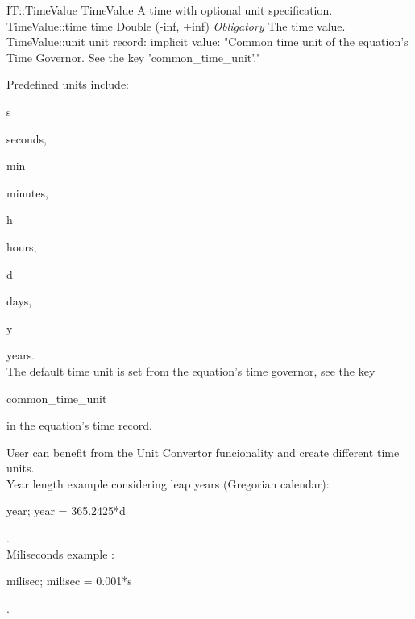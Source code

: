 \begin{TupleType}
	{IT::TimeValue}
	{TimeValue}
	{}%
	{}%
	{{{A time with optional unit specification.}%
}}
		\RecKey
			{TimeValue::time}
			{time}
			{{Double (-inf, +inf)}}{}
			{ \it{Obligatory}}
			{{{The time value.}%
}}
		\RecKey
			{TimeValue::unit}
			{unit}
			{{record: }}{}
			{implicit value: "{Common time unit of the equation's Time Governor.
See the key 'common{\_}time{\_}unit'.}"}
			{{{{Predefined units include: }\begin{ttfamily}s\end{ttfamily}{ seconds, }\begin{ttfamily}min\end{ttfamily}{ minutes, }\begin{ttfamily}h\end{ttfamily}{ hours, }\begin{ttfamily}d\end{ttfamily}{ days, }\begin{ttfamily}y\end{ttfamily}{ years.}\\{
The default time unit is set from the equation's time governor, see the key }\begin{ttfamily}common{\_}time{\_}unit\end{ttfamily}{in the equation's time record.}
% 
}{{User can benefit from the Unit Convertor funcionality and create different time units.}\\{
Year length example considering leap years (Gregorian calendar): }\begin{ttfamily}year; year = 365.2425*d\end{ttfamily}{.}\\{
Miliseconds example : }\begin{ttfamily}milisec; milisec = 0.001*s\end{ttfamily}{.}%
}}}
\end{TupleType}
